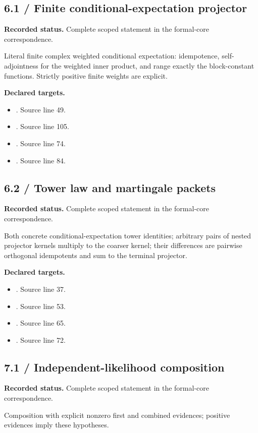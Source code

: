 \subsection{6.1 / Finite conditional-expectation projector}
\label{result:6.1}
\textbf{Recorded status.} Complete scoped statement in the formal-core correspondence.\par
Literal finite complex weighted conditional expectation: idempotence, self-adjointness for the weighted inner product, and range exactly the block-constant functions. Strictly positive finite weights are explicit.

\textbf{Declared targets.}\begin{itemize}
\item {}. Source line 49.
\item {}. Source line 105.
\item {}. Source line 74.
\item {}. Source line 84.
\end{itemize}
\subsection{6.2 / Tower law and martingale packets}
\label{result:6.2}
\textbf{Recorded status.} Complete scoped statement in the formal-core correspondence.\par
Both concrete conditional-expectation tower identities; arbitrary pairs of nested projector kernels multiply to the coarser kernel; their differences are pairwise orthogonal idempotents and sum to the terminal projector.

\textbf{Declared targets.}\begin{itemize}
\item {}. Source line 37.
\item {}. Source line 53.
\item {}. Source line 65.
\item {}. Source line 72.
\end{itemize}
\subsection{7.1 / Independent-likelihood composition}
\label{result:7.1}
\textbf{Recorded status.} Complete scoped statement in the formal-core correspondence.\par
Composition with explicit nonzero first and combined evidences; positive evidences imply these hypotheses.

